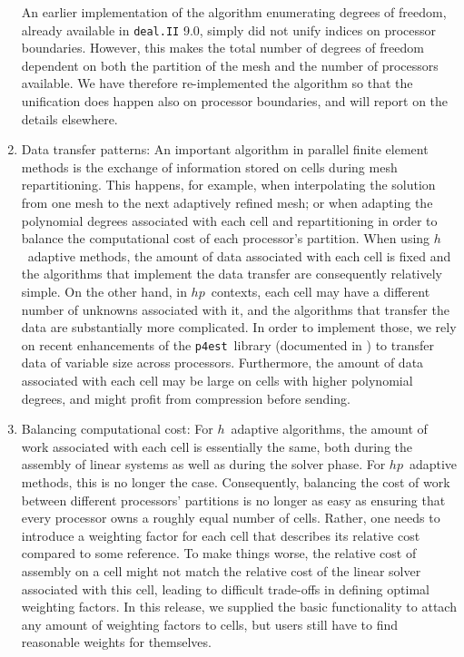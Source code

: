 \documentclass{ansarticle-preprint}
\newcommand{\specialword}[1]{\texttt{#1}}
\newcommand{\dealii}{{\specialword{deal.II}}\xspace}
\newcommand{\pfrst}{{\specialword{p4est}}\xspace}
\begin{document}
\begin{enumerate}
  An earlier implementation of the algorithm enumerating degrees of
  freedom, already available in \dealii{} 9.0, simply did not unify
  indices on processor boundaries. However, this makes the total
  number of degrees of freedom dependent on both the partition of the
  mesh and the number of processors available. We have therefore
  re-implemented the algorithm so that the unification does happen
  also on processor boundaries, and will report on the details
  elsewhere.

\item Data transfer patterns: An important algorithm in parallel
  finite element methods is the exchange of information stored on
  cells during mesh repartitioning. This happens, for example, when
  interpolating the solution from one mesh to the next
  adaptively refined mesh; or when adapting the polynomial degrees
  associated with each cell and repartitioning in order to
  balance the computational cost of each processor's partition. When
  using $h$~adaptive methods, the amount of data associated with each
  cell is fixed and the algorithms that implement the data transfer
  are consequently relatively simple. On the other hand, in $hp$~contexts,
  each cell may have a different number of unknowns
  associated with it, and the algorithms that transfer the data are
  substantially more complicated. In order to implement those, we rely
  on recent enhancements of the \pfrst~library (documented in
  \cite{Burstedde2018}) to transfer data of variable size across
  processors. Furthermore, the amount of data associated with each
  cell may be large on cells with higher polynomial degrees, and
  might profit from compression before sending.

\item Balancing computational cost: For $h$~adaptive algorithms, the
  amount of work associated with each cell is essentially the same,
  both during the assembly of linear systems as well as during the
  solver phase. For $hp$~adaptive methods, this is no longer the
  case. Consequently, balancing the cost of work between different
  processors' partitions is no longer as easy as ensuring that every
  processor owns a roughly equal number of cells. Rather, one needs to
  introduce a weighting factor for each cell that describes its
  relative cost compared to some reference. To make things worse, the
  relative cost of assembly on a cell might not match the relative
  cost of the linear solver associated with this cell, leading to
  difficult trade-offs in defining optimal weighting factors. In this
  release, we supplied the basic functionality to attach any amount
  of weighting factors to cells, but users still have to find reasonable
  weights for themselves.
\end{enumerate}
\end{document}
